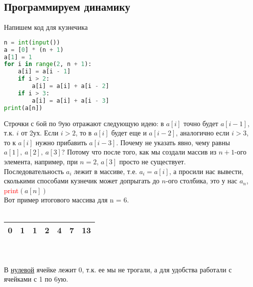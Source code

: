 \documentclass[12pt]{article} %
\begin{document}
\subsection{Программируем динамику}
Напишем код для кузнечика
\begin{lstlisting}[language=Python]
n = int(input())
a = [0] * (n + 1)
a[1] = 1
for i in range(2, n + 1):
	a[i] = a[i - 1]
	if i > 2:
		a[i] = a[i] + a[i - 2]
	if i > 3:
		a[i] = a[i] + a[i - 3]
print(a[n])
\end{lstlisting}
Строчки с 6ой по 9ую отражают следующую идею: в $a[i]$ точно будет $a[i-1]$, т.к. $i$ от 2ух. Если $i > 2$, то в $a[i]$ будет еще и $a[i - 2]$, аналогично если $i > 3$, то к $a[i]$ нужно прибавить $a[i - 3]$. Почему не указать явно, чему равны $a[1],\ a[2],\ a[3]$? Потому что после того, как мы создали массив из $n + 1$-ого элемента, например, при $n = 2$, $a[3]$ просто не существует.\\
Последовательность $a_i$ лежит в массиве, т.е. $a_i = a[i]$, а просили нас вывести, сколькими способами кузнечик может допрыгать до $n$-ого столбика, это у нас $a_n$, \textcolor{red}{print}$(a[n])$\\
Вот пример итогового массива для n = 6.\\
\\
\begin{tabular}{|c|c|c|c|c|c|c|}
	\hline
	0 & 1 & 1 & 2 & 4 & 7 & 13\\
	\hline
\end{tabular}\\
\\
В \underline{нулевой} ячейке лежит 0, т.к. ее мы не трогали, а для удобства работали с ячейками с 1 по 6ую. 
\end{document}
